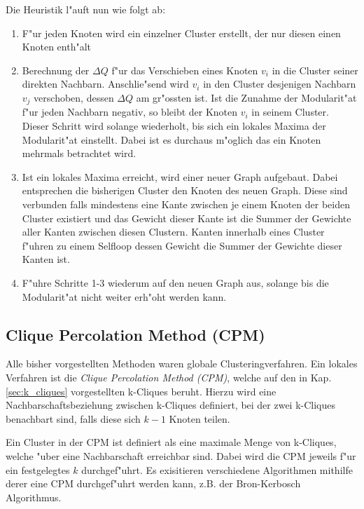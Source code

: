 \documentclass[journal]{vgtc}
\begin{document}
    Die Heuristik l"auft nun wie folgt ab:
    \begin{enumerate}
      \item F"ur jeden Knoten wird ein einzelner Cluster erstellt, der nur diesen einen Knoten enth"alt
      \item Berechnung der $\Delta Q$ f"ur das Verschieben eines Knoten $v_i$ in die Cluster seiner 
      		direkten Nachbarn. Anschlie"send wird $v_i$ in den Cluster desjenigen Nachbarn $v_j$ verschoben,
      		dessen $\Delta Q$ am gr"ossten ist. Ist die Zunahme der Modularit"at f"ur jeden Nachbarn negativ,
      		so bleibt der Knoten $v_i$ in seinem Cluster. Dieser Schritt wird solange wiederholt, bis sich
      		ein lokales Maxima der Modularit"at einstellt. Dabei ist es durchaus m"oglich das ein Knoten
      		mehrmals betrachtet wird.
      \item Ist ein lokales Maxima erreicht, wird einer neuer Graph aufgebaut. Dabei entsprechen die bisherigen
      		Cluster den Knoten des neuen Graph. Diese sind verbunden falls mindestens eine Kante zwischen
      		je einem Knoten der beiden Cluster existiert und das Gewicht dieser Kante ist die Summer
      		der Gewichte aller Kanten zwischen diesen Clustern. Kanten innerhalb eines Cluster f"uhren zu einem
      		Selfloop dessen Gewicht die Summer der Gewichte dieser Kanten ist. 
      \item F"uhre Schritte 1-3 wiederum auf den neuen Graph aus, solange bis die Modularit"at nicht
      		weiter erh"oht werden kann.
    \end{enumerate}
    
  \subsection{Clique Percolation Method (CPM)}
    \label{sec:CPM}
    Alle bisher vorgestellten Methoden waren globale Clusteringverfahren. Ein lokales Verfahren ist die
    \emph{Clique Percolation Method (CPM)}\cite{CPM}, welche auf den in Kap. \ref{sec:k_cliques}
    vorgestellten k-Cliques beruht. Hierzu wird eine Nachbarschaftsbeziehung zwischen k-Cliques definiert, 
    bei der zwei k-Cliques benachbart sind, falls diese sich $k-1$ Knoten teilen. 
    
    Ein Cluster in der CPM ist definiert als eine maximale Menge von k-Cliques, welche "uber eine Nachbarschaft
    erreichbar sind. Dabei wird die CPM jeweils f"ur ein festgelegtes $k$ durchgef"uhrt. Es exisitieren 
    verschiedene Algorithmen mithilfe derer eine CPM durchgef"uhrt werden kann, z.B. der Bron-Kerbosch Algorithmus.
    
\end{document}
